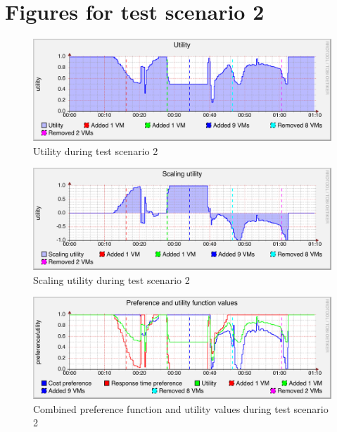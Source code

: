 \documentclass[english]{tktltiki2}
\theoremstyle{definition}
\theoremstyle{remark}
\begin{document}
\clearpage

\section{Figures for test scenario 2}

\begin{figure}[htbp]
	\includegraphics[width=\textwidth]{images/utilitygraph-test23}
	\caption{Utility during test scenario 2}
	\label{fig:utilityScenario2}
\end{figure}

\begin{figure}[htbp]
	\includegraphics[width=\textwidth]{images/scalingutilitygraph-test23}
	\caption{Scaling utility during test scenario 2}
	\label{fig:scalingUtilityScenario2}
\end{figure}

\begin{figure}[htbp]
	\includegraphics[width=\textwidth]{images/preferencesgraph-test23}
	\caption{Combined preference function and utility values during test scenario 2}
	\label{fig:preferencesScenario2}
\end{figure}
\end{document}
